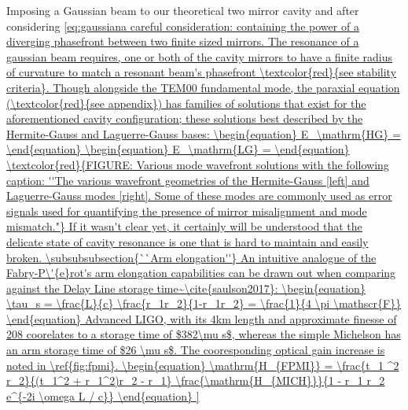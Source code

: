 Imposing a Gaussian beam to our theoretical two mirror cavity and after considering \ref{eq:gaussiana careful consideration: containing the power of a diverging phasefront between two finite sized mirrors. The resonance of a gaussian beam requires, one or both of the cavity mirrors to have a finite radius of curvature to match a resonant beam's phasefront \textcolor{red}{see stability criteria}. Though alongside the TEM00 fundamental mode, the paraxial equation (\textcolor{red}{see appendix}) has families of solutions that exist for the aforementioned cavity configuration; these solutions best described by the Hermite-Gauss and Laguerre-Gauss bases:

\begin{equation}
	E_\mathrm{HG} = 
\end{equation}


\begin{equation}
	E_\mathrm{LG} = 
\end{equation}

\textcolor{red}{FIGURE: Various mode wavefront solutions with the following caption: ''The various wavefront geometries of the Hermite-Gauss [left] and Laguerre-Gauss modes [right]. Some of these modes are commonly used as error signals used for quantifying the presence of mirror misalignment and mode mismatch."}

If it wasn't clear yet, it certainly will be understood that the delicate state of cavity resonance is one that is hard to maintain and easily broken.  

\subsubsubsection{``Arm elongation''}

An intuitive analogue of the Fabry-P\'{e}rot's arm elongation capabilities can be drawn out when comparing against the Delay Line storage time~\cite{saulson2017}:

\begin{equation}
	\tau_s = \frac{L}{c} \frac{r_1r_2}{1-r_1r_2} = \frac{1}{4 \pi \mathscr{F}}
\end{equation}

Advanced LIGO, with its 4km length and approximate finesse of 208 coorelates to a storage time of $382\mu s$, whereas the simple Michelson has an arm storage time of $26 \mu s$. The cooresponding optical gain increase is noted in \ref{fig:fpmi}. 

\begin{equation}
	\mathrm{H_{FPMI}} = \frac{t_1 ^2 r_2}{(t_1^2 + r_1^2)r_2 - r_1} \frac{\mathrm{H_{MICH}}}{1 - r_1 r_2 e^{-2i \omega L / c}}
\end{equation}

}
